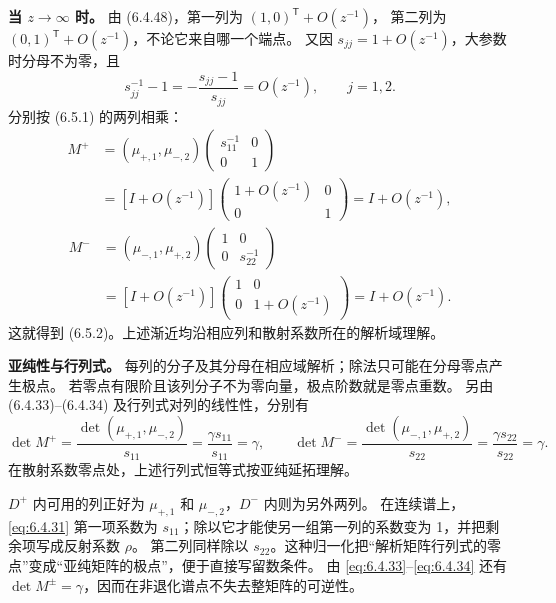 \documentclass[lang=cn,scheme=chinese,mode=simple,device=normal,color=blue,
math=cm,thmcnt=section,12pt]{elegantbook}
\begin{document}
\begin{callout}[计算：两个域的背景主部和亚纯性]
    \textbf{当 $z\to\infty$ 时。}
    由 (6.4.48)，第一列为 $(1,0)^{\mathsf T}+O(z^{-1})$，
    第二列为 $(0,1)^{\mathsf T}+O(z^{-1})$，不论它来自哪一个端点。
    又因 $s_{jj}=1+O(z^{-1})$，大参数时分母不为零，且
    \[
        s_{jj}^{-1}-1=-\dfrac{s_{jj}-1}{s_{jj}}=O(z^{-1}),\qquad j=1,2.
    \]
    分别按 (6.5.1) 的两列相乘：
    \[
        \begin{aligned}
            M^+ & =(\mu_{+,1},\mu_{-,2})\begin{pmatrix}s_{11}^{-1}&0\\0&1\end{pmatrix}      \\
                & =[I+O(z^{-1})]\begin{pmatrix}1+O(z^{-1})&0\\0&1\end{pmatrix}=I+O(z^{-1}),
        \end{aligned}
    \]
    \[
        \begin{aligned}
            M^- & =(\mu_{-,1},\mu_{+,2})\begin{pmatrix}1&0\\0&s_{22}^{-1}\end{pmatrix}      \\
                & =[I+O(z^{-1})]\begin{pmatrix}1&0\\0&1+O(z^{-1})\end{pmatrix}=I+O(z^{-1}).
        \end{aligned}
    \]
    这就得到 (6.5.2)。上述渐近均沿相应列和散射系数所在的解析域理解。

    \textbf{亚纯性与行列式。}
    每列的分子及其分母在相应域解析；除法只可能在分母零点产生极点。
    若零点有限阶且该列分子不为零向量，极点阶数就是零点重数。
    另由 (6.4.33)--(6.4.34) 及行列式对列的线性性，分别有
    \[
        \det M^+=\dfrac{\det(\mu_{+,1},\mu_{-,2})}{s_{11}}
        =\dfrac{\gamma s_{11}}{s_{11}}=\gamma,\qquad
        \det M^-=\dfrac{\det(\mu_{-,1},\mu_{+,2})}{s_{22}}
        =\dfrac{\gamma s_{22}}{s_{22}}=\gamma.
    \]
    在散射系数零点处，上述行列式恒等式按亚纯延拓理解。
\end{callout}

\begin{callout}
    $D^+$ 内可用的列正好为 $\mu_{+,1}$ 和 $\mu_{-,2}$，$D^-$ 内则为另外两列。
    在连续谱上，\eqref{eq:6.4.31} 第一项系数为 $s_{11}$；除以它才能使另一组第一列的系数变为 1，并把剩余项写成反射系数 $\rho$。
    第二列同样除以 $s_{22}$。这种归一化把“解析矩阵行列式的零点”变成“亚纯矩阵的极点”，便于直接写留数条件。
    由 \eqref{eq:6.4.33}--\eqref{eq:6.4.34} 还有 $\det M^\pm=\gamma$，因而在非退化谱点不失去整矩阵的可逆性。
\end{callout}
\end{document}
